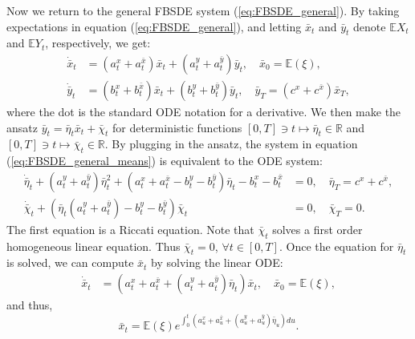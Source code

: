 \documentclass[11pt]{article}
\begin{document}
\begin{appendices}
Now we return to the general FBSDE system (\ref{eq:FBSDE_general}). By taking expectations in equation (\ref{eq:FBSDE_general}), and letting $\bar{x}_t$ and $\bar{y}_t$ denote $\mathbb{E}X_t$ and $\mathbb{E}Y_t$, respectively, we get:
\begin{equation}
\begin{split}
        \dot{\bar{x}}_t&=(a^x_t+a^{\bar{x}}_t)\bar{x}_t+(a^y_t+a^{\bar{y}}_t)\bar{y}_t, \quad \bar{x}_0=\mathbb{E}(\xi), \\
        \dot{\bar{y}}_t&=(b^x_t+b^{\bar{x}}_t)\bar{x}_t+(b^y_t+b^{\bar{y}}_t)\bar{y}_t, \quad \bar{y}_T=(c^x+c^{\bar{x}})\bar{x}_T,
\end{split}
\label{eq:FBSDE_general_means}
\end{equation}
where the dot is the standard ODE notation for a derivative. We then make the ansatz $\bar{y}_t=\bar{\eta}_t\bar{x}_t+\bar{\chi}_t$ for deterministic functions $[0,T] \ni t \mapsto \bar{\eta}_t \in \mathbb{R}$ and $[0,T] \ni t \mapsto \bar{\chi}_t \in \mathbb{R}$. By plugging in the ansatz, the system in equation (\ref{eq:FBSDE_general_means}) is equivalent to the ODE system:
\begin{equation*}
\begin{split}
    \dot{\bar{\eta}}_t+(a^y_t+a^{\bar{y}}_t) \bar{\eta}_t^2+(a^x_t+a^{\bar{x}}_t-b^y_t-b^{\bar{y}}_t) \bar{\eta}_t -b^x_t-b^{\bar{x}}_t&=0, \quad \bar{\eta}_T=c^x+c^{\bar{x}}, \\
    \dot{\bar{\chi}}_t+(\bar{\eta}_t(a^y_t+a^{\bar{y}}_t)-b^y_t-b^{\bar{y}}_t)\bar{\chi}_t &=0, \quad \bar{\chi}_T=0.
\end{split}
\end{equation*}
The first equation is a Riccati equation. Note that $\bar{\chi}_t$ solves a first order homogeneous linear equation. Thus $\bar{\chi}_t=0$, $\forall t\in[0,T]$. Once the equation for $\bar{\eta}_t$ is solved, we can compute $\bar{x}_t$ by solving the linear ODE:
\begin{equation*}
\begin{split}
    \dot{\bar{x}}_t&=(a^x_t+a^{\bar{x}}_t+(a^y_t+a^{\bar{y}}_t)\bar{\eta}_t)\bar{x}_t, \quad \bar{x}_0=\mathbb{E}(\xi),
\end{split}
\end{equation*}
and thus,
\begin{equation*}
    \bar{x}_t=\mathbb{E}(\xi) e^{\int_0^t(a^x_u+a^{\bar{x}}_u+(a^y_u+a^{\bar{y}}_u)\bar{\eta}_u)du}.
\end{equation*}


\end{appendices}
\end{document}
